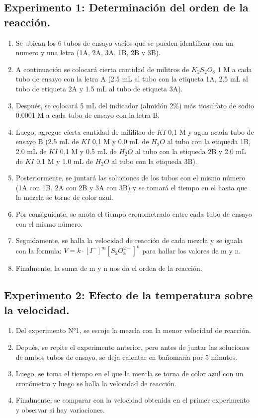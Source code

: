 \documentclass[../main.tex]{subfiles}
\begin{document}
    \subsection{Experimento 1: Determinación del orden de la reacción.}
    \begin{enumerate}
    \item Se ubican los 6 tubos de ensayo vacíos que se pueden identificar con un numero y una letra (1A, 2A, 3A, 1B, 2B y 3B).
    \item A continuación se colocará cierta cantidad de militros de $K_2$$S_2$$O_8$ 1 M a cada tubo de ensayo con la letra A (2.5 mL al tubo con la etiqueta 1A, 2.5 mL al tubo de etiqueta 2A y 1.5 mL al tubo de etiqueta 3A).
    \item Después, se colocará 5 mL del indicador (almidón 2\%) más tiosulfato de sodio 0.0001 M  a cada tubo de ensayo con la letra B.
    \item  Luego, agregue cierta cantidad de mililitro de $KI$ 0,1 M y agua acada tubo de ensayo B (2.5 mL de $KI$ 0,1 M y 0.0 mL de $H_2O$  al tubo con la etiqueda 1B,  2.0 mL de $KI$ 0,1 M y 0.5 mL de $H_2O$  al tubo con la etiqueda 2B y 2.0 mL de $KI$ 0,1 M y 1.0 mL de $H_2O$  al tubo con la etiqueda 3B).
    \item Posteriormente, se juntará las soluciones de los tubos con el mismo número (1A con 1B, 2A con 2B y 3A con 3B) y se tomará el tiempo en el hasta que la mezcla se torne de color azul.
    \item Por consiguiente, se anota el tiempo cronometrado entre cada tubo de ensayo con el mismo número.
    \item Seguidamente, se halla la velocidad de reacción de cada mezcla y se iguala con la formula: $V=k\cdot[I^{-}]^{m}[S_2O_8^{2-}]^{n}$ para hallar los valores de m y n.
    \item Finalmente, la suma de m y n nos da el orden de la reacción.
    \end{enumerate}

    \subsection{Experimento 2: Efecto de la temperatura sobre la velocidad.}
    \begin{enumerate}
    \item Del experimento N°1, se escoje la mezcla con la menor velocidad de reacción.
    \item Depués, se repite el experimento anterior, pero antes de juntar las soluciones de ambos tubos de ensayo, se deja calentar en bañomaría por 5 minutos.
    \item Luego, se toma el tiempo en el que la mezcla se torna de color azul con un cronómetro y luego se halla la velocidad de reacción.
    \item Finalmente, se comparar con la velocidad obtenida en el primer experimento y observar si hay variaciones.
    \end{enumerate}
\end{document}
